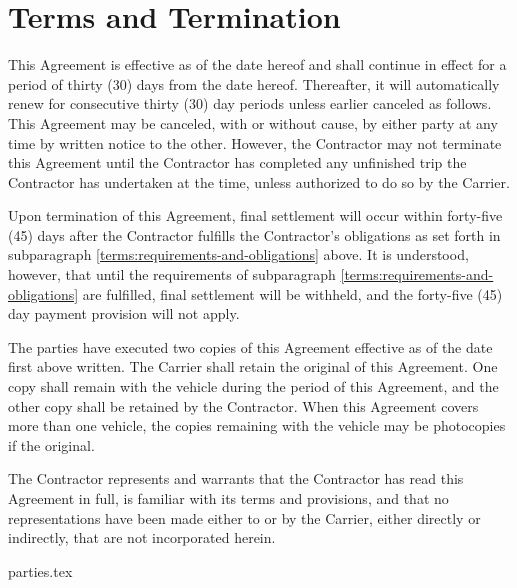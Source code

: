 \section{Terms and Termination}
{
    \setlength{\parskip}{\baselineskip}
    \setlength{\parindent}{0pt}

    This Agreement is effective as of the date hereof and shall continue in
    effect for a period of thirty (30) days from the date hereof.
    Thereafter, it will automatically renew for consecutive thirty (30) day
    periods unless earlier canceled as follows. This Agreement may be
    canceled, with or without cause, by either party at any time by written
    notice to the other. However, the Contractor may not terminate this
    Agreement until the Contractor has completed any unfinished trip the
    Contractor has undertaken at the time, unless authorized to do so by
    the Carrier.

    Upon termination of this Agreement, final settlement will occur within
    forty-five (45) days after the Contractor fulfills the Contractor's
    obligations as set forth in subparagraph
    \ref{terms:requirements-and-obligations} above. It is understood,
    however, that until the requirements of subparagraph
    \ref{terms:requirements-and-obligations} are fulfilled, final
    settlement will be withheld, and the forty-five (45) day payment
    provision will not apply.

    The parties have executed two copies of this Agreement effective as of
    the date first above written. The Carrier shall retain the original of
    this Agreement. One copy shall remain with the vehicle during the
    period of this Agreement, and the other copy shall be retained by the
    Contractor. When this Agreement covers more than one vehicle, the
    copies remaining with the vehicle may be photocopies if the original.

    The Contractor represents and warrants that the Contractor has read
    this Agreement in full, is familiar with its terms and provisions, and
    that no representations have been made either to or by the Carrier,
    either directly or indirectly, that are not incorporated herein.
    
    {parties.tex}
}